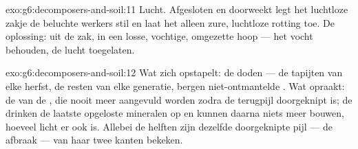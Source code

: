 \begin{solution}{exo:g6:decomposers-and-soil:11}
Lucht. Afgesloten en doorweekt legt het luchtloze zakje de beluchte
werkers stil en laat het alleen zure, luchtloze rotting toe. De
oplossing: uit de zak, in een losse, vochtige, omgezette hoop --- het
vocht behouden, de lucht toegelaten.
\end{solution}

\begin{solution}{exo:g6:decomposers-and-soil:12}
Wat zich opstapelt: de doden --- de tapijten van elke herfst, de resten
van elke generatie, bergen niet-ontmantelde . Wat
opraakt: de  van de , die nooit meer aangevuld worden
zodra de terugpijl doorgeknipt is; de  drinken de laatste
opgeloste mineralen op en kunnen daarna niets meer bouwen, hoeveel licht
er ook is. Allebei de helften zijn dezelfde doorgeknipte pijl --- de
afbraak --- van haar twee kanten bekeken.
\end{solution}

